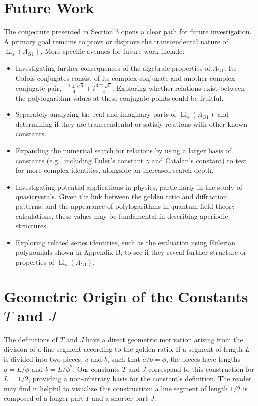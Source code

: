 \documentclass{amsart}
\theoremstyle{plain}
\theoremstyle{definition}
\theoremstyle{remark}
\DeclareMathOperator{\Li}{Li}
\newcommand{\LambdaG}{\Lambda_{G1}}
\newcommand{\phiG}{\phi}
\begin{document}
\section{Future Work}
The conjecture presented in Section 3 opens a clear path for future investigation. A primary goal remains to prove or disprove the transcendental nature of $\Li_s(\LambdaG)$. More specific avenues for future work include:
\begin{itemize}
    \item Investigating further consequences of the algebraic properties of $\LambdaG$. Its Galois conjugates consist of its complex conjugate and another complex conjugate pair, $\frac{-1\pm\sqrt{5}}{4} \pm i\frac{3\mp\sqrt{5}}{4}$. Exploring whether relations exist between the polylogarithm values at these conjugate points could be fruitful.
    \item Separately analyzing the real and imaginary parts of $\Li_s(\LambdaG)$ and determining if they are transcendental or satisfy relations with other known constants.
    \item Expanding the numerical search for relations by using a larger basis of constants (e.g., including Euler's constant $\gamma$ and Catalan's constant) to test for more complex identities, alongside an increased search depth.
    \item Investigating potential applications in physics, particularly in the study of quasicrystals. Given the link between the golden ratio and diffraction patterns, and the appearance of polylogarithms in quantum field theory calculations, these values may be fundamental in describing aperiodic structures.
    \item Exploring related series identities, such as the evaluation using Eulerian polynomials shown in Appendix B, to see if they reveal further structure or properties of $\Li_s(\LambdaG)$.
\end{itemize}

\appendix
\section{Geometric Origin of the Constants \texorpdfstring{$T$ and $J$}{T and J}}
The definitions of $T$ and $J$ have a direct geometric motivation arising from the division of a line segment according to the golden ratio. If a segment of length $L$ is divided into two pieces, $a$ and $b$, such that $a/b = \phiG$, the pieces have lengths $a=L/\phiG$ and $b=L/\phiG^2$. Our constants $T$ and $J$ correspond to this construction for $L=1/2$, providing a non-arbitrary basis for the constant's definition. The reader may find it helpful to visualize this construction: a line segment of length $1/2$ is composed of a longer part $T$ and a shorter part $J$.
\end{document}
